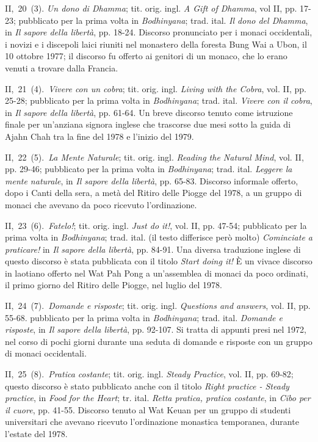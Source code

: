 II,~20~(3). \emph{Un dono di Dhamma}; tit. orig. ingl. \emph{A Gift of
Dhamma}, vol II, pp. 17-23; pubblicato per la prima volta in
\emph{Bodhinyana}; trad. ital. \emph{Il dono del Dhamma}, in \emph{Il
sapore della libertà}, pp. 18-24. Discorso pronunciato per i monaci
occidentali, i novizi e i discepoli laici riuniti nel monastero della
foresta Bung Wai a Ubon, il 10 ottobre 1977; il discorso fu offerto ai
genitori di un monaco, che lo erano venuti a trovare dalla Francia.

II,~21~(4).~\emph{Vivere con un cobra}; tit. orig. ingl. \emph{Living
with the Cobra}, vol. II, pp. 25-28; pubblicato per la prima volta in
\emph{Bodhinyana}; trad. ital. \emph{Vivere con il cobra}, in \emph{Il
sapore della libertà}, pp. 61-64. Un breve discorso tenuto come
istruzione finale per un'anziana signora inglese che trascorse due mesi
sotto la guida di Ajahn Chah tra la fine del 1978 e l'inizio del 1979.

II,~22~(5).~\emph{La Mente Naturale}; tit. orig. ingl. \emph{Reading the
Natural Mind}, vol. II, pp. 29-46; pubblicato per la prima volta in
\emph{Bodhinyana}; trad. ital. \emph{Leggere la mente naturale}, in
\emph{Il sapore della libertà}, pp. 65-83. Discorso informale offerto,
dopo i Canti della sera, a metà del Ritiro delle Piogge del 1978, a un
gruppo di monaci che avevano da poco ricevuto l'ordinazione.

II,~23~(6).~\emph{Fatelo!}; tit. orig. ingl. \emph{Just do it!}, vol.
II, pp. 47-54; pubblicato per la prima volta in \emph{Bodhinyana}; trad.
ital. (il testo differisce però molto) \emph{Cominciate a praticare!} in
\emph{Il sapore della libertà}, pp. 84-91. Una diversa traduzione
inglese di questo discorso è stata pubblicata con il titolo \emph{Start
doing it!} È un vivace discorso in laotiano offerto nel Wat Pah Pong a
un'assemblea di monaci da poco ordinati, il primo giorno del Ritiro
delle Piogge, nel luglio del 1978.

II,~24~(7).~\emph{Domande e risposte}; tit. orig. ingl. \emph{Questions
and answers}, vol. II, pp. 55-68. pubblicato per la prima volta in
\emph{Bodhinyana}; trad. ital. \emph{Domande e risposte}, in \emph{Il
sapore della libertà}, pp. 92-107. Si tratta di appunti presi nel 1972,
nel corso di pochi giorni durante una seduta di domande e risposte con
un gruppo di monaci occidentali.

II,~25~(8).~\emph{Pratica costante}; tit. orig. ingl. \emph{Steady
Practice}, vol. II, pp. 69-82; questo discorso è stato pubblicato anche
con il titolo \emph{Right practice - Steady practice}, in \emph{Food}
\emph{for the Heart}; tr. ital. \emph{Retta pratica, pratica costante},
in \emph{Cibo per il cuore}, pp. 41-55. Discorso tenuto al Wat Keuan per
un gruppo di studenti universitari che avevano ricevuto l'ordinazione
monastica temporanea, durante l'estate del 1978.

